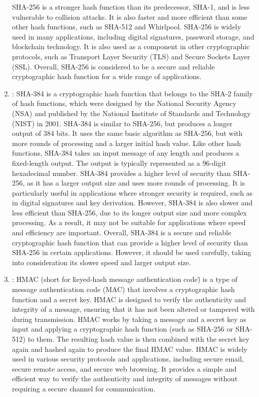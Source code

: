 \documentclass{article}
\newcommand{\code}[1]{\tcbox[
    on line,
    colback=codebackground, boxsep=2pt,
    colframe=white, boxrule=0pt,
    top=0pt, bottom=0pt, left=0pt, right=0pt
]{\texttt{#1}}}
\begin{document}
\begin{enumerate}
          SHA-256 is a stronger hash function than its predecessor, SHA-1, and is less vulnerable to collision attacks.
          It is also faster and more efficient than some other hash functions, such as SHA-512 and Whirlpool.
          SHA-256 is widely used in many applications, including digital signatures, password storage, and blockchain technology.
          It is also used as a component in other cryptographic protocols, such as Transport Layer Security (TLS) and Secure Sockets Layer (SSL).
          Overall, SHA-256 is considered to be a secure and reliable cryptographic hash function for a wide range of applications.
    \item \code{SHA384()}:
          SHA-384 is a cryptographic hash function that belongs to the SHA-2 family of hash functions, which were designed by the National Security Agency (NSA) and published by the National Institute of Standards and Technology (NIST) in 2001.
          SHA-384 is similar to SHA-256, but produces a longer output of 384 bits.
          It uses the same basic algorithm as SHA-256, but with more rounds of processing and a larger initial hash value.
          Like other hash functions, SHA-384 takes an input message of any length and produces a fixed-length output.
          The output is typically represented as a 96-digit hexadecimal number.
          SHA-384 provides a higher level of security than SHA-256, as it has a larger output size and uses more rounds of processing.
          It is particularly useful in applications where stronger security is required, such as in digital signatures and key derivation.
          However, SHA-384 is also slower and less efficient than SHA-256, due to its longer output size and more complex processing.
          As a result, it may not be suitable for applications where speed and efficiency are important.
          Overall, SHA-384 is a secure and reliable cryptographic hash function that can provide a higher level of security than SHA-256 in certain applications.
          However, it should be used carefully, taking into consideration its slower speed and larger output size.
    \item \code{HMAC()}:
          HMAC (short for \"keyed-hash message authentication code\") is a type of message authentication code (MAC) that involves a cryptographic hash function and a secret key.
          HMAC is designed to verify the authenticity and integrity of a message, ensuring that it has not been altered or tampered with during transmission.
          HMAC works by taking a message and a secret key as input and applying a cryptographic hash function (such as SHA-256 or SHA-512) to them.
          The resulting hash value is then combined with the secret key again and hashed again to produce the final HMAC value.
          HMAC is widely used in various security protocols and applications, including secure email, secure remote access, and secure web browsing.
          It provides a simple and efficient way to verify the authenticity and integrity of messages without requiring a secure channel for communication.
\end{enumerate}
\end{document}
